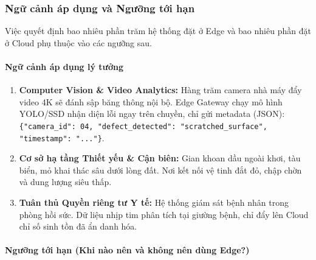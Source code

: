 \subsubsection{Ngữ cảnh áp dụng và Ngưỡng tới hạn}
\label{subsec:edge-cloud-thresholds}

Việc quyết định bao nhiêu phần trăm hệ thống đặt ở Edge và bao nhiêu phần đặt ở Cloud phụ thuộc vào các ngưỡng sau.

\paragraph*{Ngữ cảnh áp dụng lý tưởng}

\begin{enumerate}
    \item \textbf{Computer Vision \& Video Analytics:}
    Hàng trăm camera nhà máy đẩy video 4K sẽ đánh sập băng thông nội bộ. Edge Gateway chạy mô hình YOLO/SSD nhận diện lỗi ngay trên chuyền, chỉ gửi metadata (JSON): \texttt{\{"camera\_id": 04, "defect\_detected": "scratched\_surface", "timestamp": "..."\}}.

    \item \textbf{Cơ sở hạ tầng Thiết yếu \& Cận biên:}
    Gian khoan dầu ngoài khơi, tàu biển, mỏ khai thác sâu dưới lòng đất. Nơi kết nối vệ tinh đắt đỏ, chập chờn và dung lượng siêu thấp.

    \item \textbf{Tuân thủ Quyền riêng tư Y tế:}
    Hệ thống giám sát bệnh nhân trong phòng hồi sức. Dữ liệu nhịp tim phân tích tại giường bệnh, chỉ đẩy lên Cloud chỉ số sinh tồn đã ẩn danh hóa.
\end{enumerate}

\paragraph*{Ngưỡng tới hạn (Khi nào nên và không nên dùng Edge?)}

